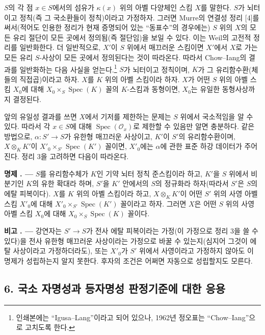 \documentclass[11pt,twoside,openany]{book}
\numberwithin{equation}{section}
\newcommand{\sourceunit}{front}
\newcommand{\src}[1]{%
  \phantomsection\hypertarget{src:\sourceunit:#1}{}%
  \marginpar{\raggedleft\footnotesize\sffamily #1}%
}
\theoremstyle{plain}
\theoremstyle{definition}
\theoremstyle{remark}
\newcommand{\result}[2]{%
  \par\medskip\noindent\textbf{#1%
  \if\relax\detokenize{#2}\relax\else\space#2\fi. ---}\enspace
}
\begin{document}
\src{324}
$S$의 각 점 $x\in S$에서의 섬유가 $\kappa(x)$ 위의 아벨 다양체인
스킴 $X$를 말한다. $S$가 뇌터이고 정칙(즉 그 국소환들이 정칙)이라고
가정하자. 그러면 Murre의 연결성 정리 [4]를 써서(적어도 인용한 정리가
현재 증명되어 있는 ``동표수''의 경우에는) $S$ 위의 $X$의 모든 유리
절단이 모든 곳에서 정의됨(즉 절단임)을 보일 수 있다. 이는 Weil의
고전적 정리를 일반화한다. 더 일반적으로, $X'$이 $S$ 위에서 매끄러운
스킴이면 $X'$에서 $X$로 가는 모든 유리 $S$-사상이 모든 곳에서
정의된다는 것이 따라온다. 따라서 Chow--Iang의 결과를 일반화하는 다음
사실을 얻는다.\footnote{인쇄본에는 ``Igusa--Lang''이라고 되어 있으나,
1962년 정오표는 ``Chow--Iang''으로 고치도록 한다.} $S$가 뇌터이고
정칙이며, $K$가 그 유리함수환(체들의 직접곱)이라고 하자. $X$를 $K$
위의 아벨 스킴이라 하자. $X$가 어떤 $S$ 위의 아벨 스킴 $X_0$에 대해
$X_0\times_S\operatorname{Spec}(K)$ 꼴의 $K$-스킴과 동형이면, $X_0$는
유일한 동형사상까지 결정된다.

앞의 유일성 결과를 쓰면 $X$에서 기저를 제한하는 문제는 $S$ 위에서
국소적임을 알 수 있다. 따라서 각 $x\in S$에 대해
$\operatorname{Spec}(\mathcal O_x)$로 제한할 수 있음만 알면 충분하다.
같은 방법으로, $\alpha:S'\longrightarrow S$가 유한형 매끄러운 사상이고,
$K'$이 $S'$의 유리함수환이며, $X\otimes_KK'$이
$X'_0\times_{S'}\operatorname{Spec}(K')$ 꼴이면, $X'_0$에는
$\alpha$에 관한 표준 하강 데이터가 주어진다. 정리 3을 고려하면 다음이
따라온다.

\result{명제}{5.1} $S$를 유리함수체가 $K$인 기약 뇌터 정칙 준스킴이라
하고, $K'$을 $S$ 위에서 비분기인 $K$의 유한 확대라 하며, $S'$을
$K'$ 안에서의 $S$의 정규화라 하자(따라서 $S'$은 $S$의 에탈 피복이다).
$X$를 $K$ 위의 아벨 스킴이라 하고, $X\otimes_KK'$이 어떤 $S'$ 위의
사영 아벨 스킴 $X'_0$에 대해
$X'_0\times_{S'}\operatorname{Spec}(K')$ 꼴이라고 하자. 그러면 $X$은
어떤 $S$ 위의 사영 아벨 스킴 $X_0$에 대해
$X_0\times_S\operatorname{Spec}(K)$ 꼴이다.

\result{비고}{} 강연자는 $S'\longrightarrow S$가 전사 에탈 피복이라는
가정(이 가정으로 정리 3을 쓸 수 있다)을 전사 유한형 매끄러운 사상이라는
가정으로 바꿀 수 있는지(심지어 그것이 에탈 사상이라고 가정하더라도),
또는 $X'_0$가 $S'$ 위에서 사영이라고 가정하지 않아도 이 명제가
성립하는지 알지 못한다. 후자의 조건은 어쩌면 자동으로 성립할지도 모른다.

\subsection*{6. 국소 자명성과 등자명성 판정기준에 대한 응용}
\end{document}

